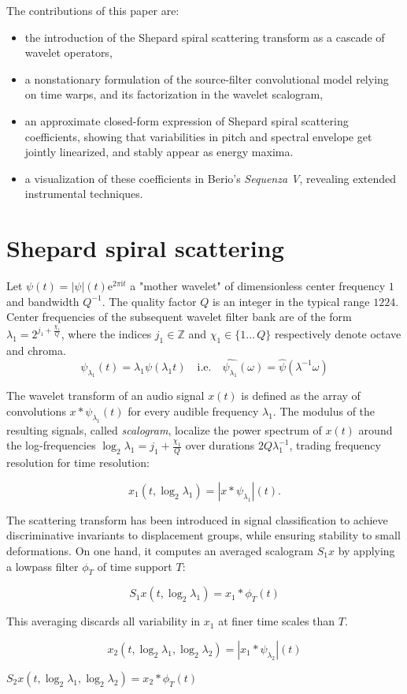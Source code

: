 \documentclass[twoside,a4paper]{article}
\begin{document}
The contributions of this paper are:
\begin{itemize}
\item
the introduction of the Shepard spiral scattering transform as a cascade of wavelet operators,
\item
a nonstationary formulation of the source-filter convolutional model relying on time warps, and its factorization in the wavelet scalogram,
\item
an approximate closed-form expression of Shepard spiral scattering coefficients, showing that variabilities in pitch and spectral envelope get jointly linearized, and stably appear as energy maxima.
\item
a visualization of these coefficients in Berio's \emph{Sequenza V}, revealing extended instrumental techniques.
\end{itemize}

\section{Shepard spiral scattering}

Let $\psi(t)=\vert\psi\vert(t)\mathrm{e}^{2\pi\mathrm{i}t}$ a "mother wavelet" of dimensionless center frequency $1$ and bandwidth $Q^{-1}$. The quality factor $Q$ is an integer in the typical range $12$\textendash$24$.
Center frequencies of the subsequent wavelet filter bank are of the
form $\lambda_{1} = 2^{j_{1} + \frac{\chi_{1}}{Q}}$, where the indices
$j_{1} \in \mathbb{Z}$ and $\chi_1 \in \{1\ldots\,Q\}$ respectively denote
octave and chroma.
\[
\psi_{\lambda_{1}}(t)=\lambda_{1}\psi(\lambda_{1}t)\quad\mathrm{i.e.}\quad\widehat{\psi_{\lambda_{1}}}(\omega)=\widehat{\psi}(\lambda^{-1}\omega)
\]

The wavelet transform of an audio signal $x(t)$ is defined as the array of convolutions $x \ast \psi_{\lambda_1}(t)$ for every audible frequency $\lambda_1$. The modulus of the resulting signals, called \emph{scalogram}, localize the power spectrum of $x(t)$ around the log-frequencies $\log_2 \lambda_1 = j_1 + \frac{\chi_1}{Q}$ over durations $2 Q \lambda_1^{-1}$, trading frequency resolution for time resolution:

\[
x_1 (t, \log_{2}\lambda_{1}) = \left| x \ast \psi_{\lambda_{1}} \right| (t).
\]

The scattering transform has been introduced in signal classification to achieve discriminative invariants to displacement groups, while ensuring stability to small deformations. On one hand, it computes an averaged scalogram $S_1 x$ by applying a lowpass filter $\phi_T$ of time support $T$:

\[
S_1 x (t, \log_2 \lambda_1) = x_1 \ast \phi_T (t)
\]

This averaging discards all variability in $x_1$ at finer time scales than $T$.

\[
x_2 (t, \log_2 \lambda_1, \log_2 \lambda_2) = \left| x_1 \ast \psi_{\lambda_{2}} \right| (t)
\]

$S_2 x (t, \log_2 \lambda_1, \log_2 \lambda_2) = x_2 \ast \phi_T (t)$



\nocite{*}

 
\end{document}
